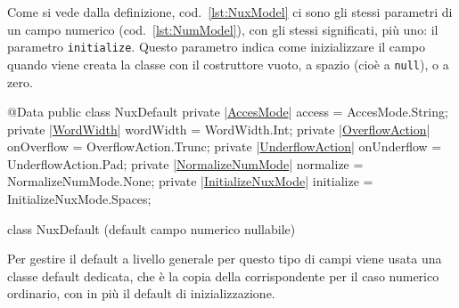 \documentclass[a4paper,10pt]{report}
\newif\ifesource
\newenvironment{elisting}[1][H]
  {\captionsetup{aboveskip=0pt}\begin{listing}[#1]}
  {\end{listing}%
}
\begin{document}
Come si vede dalla definizione, cod.~\ref{lst:NuxModel} ci sono gli stessi
parametri di un campo numerico (cod.~\ref{lst:NumModel}), con gli stessi 
significati, più uno: il parametro \verb!initialize!.
Questo parametro indica come inizializzare il campo quando viene creata la
classe con il costruttore vuoto, a spazio (cioè a \verb!null!), o a zero.

\ifesource
\begin{figure*}[!htb]
\begin{lstlisting}[language=java, 
caption=class NuxDefault (default campo numerico nullabile), 
label=lst:NuxDefault]
@Data
public class NuxDefault {
    private (*\hyperref[lst:AccesMode]{AccesMode}*) access = AccesMode.String;
    private (*\hyperref[lst:WordWidth]{WordWidth}*) wordWidth = WordWidth.Int;
    private (*\hyperref[lst:OverflowAction]{OverflowAction}*) onOverflow = OverflowAction.Trunc;
    private (*\hyperref[lst:UnderflowAction]{UnderflowAction}*) onUnderflow = UnderflowAction.Pad;
    private (*\hyperref[lst:NormalizeNumMode]{NormalizeNumMode}*) normalize = NormalizeNumMode.None;
    private (*\hyperref[lst:InitializeNuxMode]{InitializeNuxMode}*) initialize = InitializeNuxMode.Spaces;
}
\end{lstlisting}\index{NuxDefault}
\end{figure*}
\else
\begin{elisting}[!htb]
\begin{javacode}
@Data
public class NuxDefault {
    private |\hyperref[lst:AccesMode]{AccesMode}| access = AccesMode.String;
    private |\hyperref[lst:WordWidth]{WordWidth}| wordWidth = WordWidth.Int;
    private |\hyperref[lst:OverflowAction]{OverflowAction}| onOverflow = OverflowAction.Trunc;
    private |\hyperref[lst:UnderflowAction]{UnderflowAction}| onUnderflow = UnderflowAction.Pad;
    private |\hyperref[lst:NormalizeNumMode]{NormalizeNumMode}| normalize = NormalizeNumMode.None;
    private |\hyperref[lst:InitializeNuxMode]{InitializeNuxMode}| initialize = InitializeNuxMode.Spaces;
}
\end{javacode}
\caption{class NuxDefault (default campo numerico nullabile)}
\label{lst:NuxDefault}
\end{elisting}
\fi

Per gestire il default a livello generale per questo tipo di campi viene usata
una classe default dedicata, che è la copia della corrispondente per il caso
numerico ordinario, con in più il default di inizializzazione.
\end{document}
